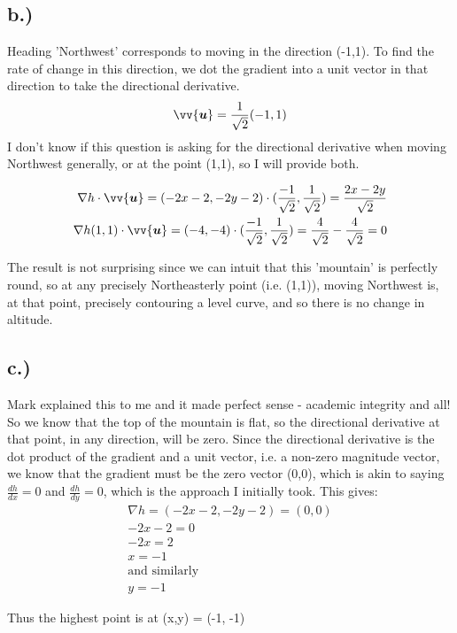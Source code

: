 \documentclass{article}
\begin{document}
\subsection*{b.)}
Heading 'Northwest' corresponds to moving in the direction (-1,1). To find the rate of change in this direction, we dot the gradient into a unit vector in that direction to take the directional derivative.
\begin{equation}
\vv{\bm{u}} = \frac{1}{\sqrt{2}}(-1, 1)
\end{equation}
I don't know if this question is asking for the directional derivative when moving Northwest generally, or at the point (1,1), so I will provide both.
\begin{tcolorbox}[minipage,colback=white,arc=0pt,outer arc=0pt]
\begin{equation}
\begin{aligned}
\nabla h \cdot \vv{\bm{u}} = (-2x -2, -2y -2) \cdot (\frac{-1}{\sqrt{2}}, \frac{1}{\sqrt{2}}) = \frac{2x - 2y}{\sqrt{2}}\\
\nabla h(1,1) \cdot \vv{\bm{u}} = (-4, -4) \cdot (\frac{-1}{\sqrt{2}},\frac{1}{\sqrt{2}}) = \frac{4}{\sqrt{2}} - \frac{4}{\sqrt{2}} = 0
\end{aligned}
\end{equation}
\end{tcolorbox}
The result is not surprising since we can intuit that this 'mountain' is perfectly round, so at any precisely Northeasterly point (i.e. (1,1)), moving Northwest is, at that point, precisely contouring a level curve, and so there is no change in altitude. 
\subsection*{c.)}
Mark explained this to me and it made perfect sense - academic integrity and all! So we know that the top of the mountain is flat, so the directional derivative at that point, in any direction, will be zero. Since the directional derivative is the dot product of the gradient and a unit vector, i.e. a non-zero magnitude vector, we know that the gradient must be the zero vector (0,0), which is akin to saying $\frac{dh}{dx} = 0$ and $\frac{dh}{dy} = 0$, which is the approach I initially took. This gives:
\begin{equation}
\begin{aligned}
\nabla h = (-2x -2, -2y -2) = (0 , 0)\\
-2x -2 = 0\\
-2x = 2\\
x = -1\\
\text{and similarly}\\
y = -1
\end{aligned}
\end{equation}
\begin{tcolorbox}[minipage,colback=white,arc=0pt,outer arc=0pt]
Thus the highest point is at (x,y) = (-1, -1)
\end{tcolorbox}
\end{document}
